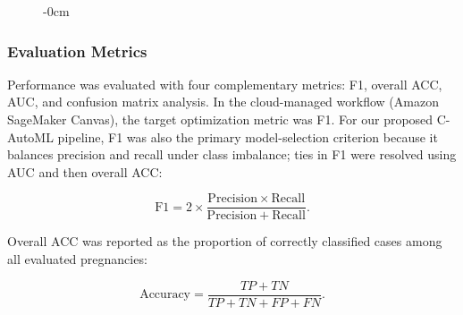 \documentclass[diagnostics,article,submit,pdftex,moreauthors]{Definitions/mdpi}
\begin{document}
\begin{figure}[H]
\begin{adjustwidth}{-\extralength}{0cm}
\begin{tikzpicture}
\end{tikzpicture}
\end{adjustwidth}
\caption{}
\label{fig:c-automl-flowchart}
\end{figure}

\subsubsection{Evaluation Metrics}
\label{sec:evaluation-metrics}
Performance was evaluated with four complementary metrics: \ac{F1},
overall \ac{ACC}, \ac{AUC}, and confusion matrix analysis. In the
cloud-managed workflow (Amazon SageMaker Canvas), the target
optimization metric was \ac{F1}. For our proposed \ac{C-AutoML} pipeline,
\ac{F1} was also the primary model-selection criterion because it
balances precision and recall under class imbalance; ties in \ac{F1}
were resolved using \ac{AUC} and then overall \ac{ACC}:

\begin{linenomath}
\begin{equation}
\mathrm{F1}=2\times\frac{\mathrm{Precision}\times\mathrm{Recall}}{\mathrm{Precision}+\mathrm{Recall}}.
\label{eq:f1-score}
\end{equation}
\end{linenomath}

Overall \ac{ACC} was reported as the proportion of correctly
classified cases among all evaluated pregnancies:

\begin{linenomath}
\begin{equation}
\mathrm{Accuracy}=\frac{TP+TN}{TP+TN+FP+FN}.
\label{eq:accuracy}
\end{equation}
\end{linenomath}
\end{document}
